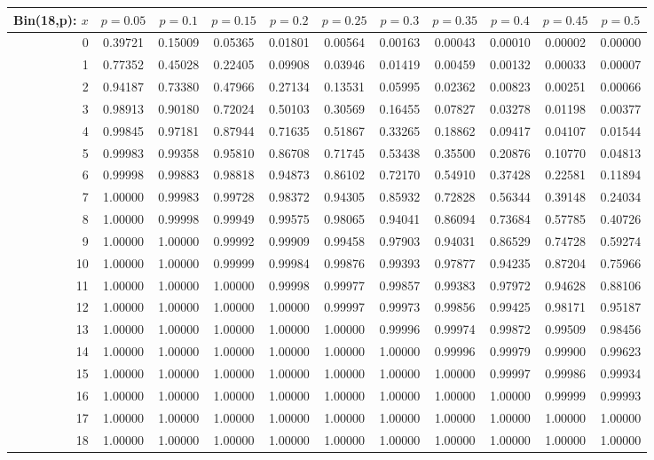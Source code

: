 \vspace{8pt minus 6pt}
\begin{tabular}{@{\extracolsep{-2pt}}|r|c|c|c|c|c|c|c|c|c|c|}
\hline
Bin(18,p): $x$
   & $p\!=\!0.05$& $p\!=\!0.1$& $p\!=\!0.15$& $p\!=\!0.2$& $p\!=\!0.25$& $p\!=\!0.3$& $p\!=\!0.35$& $p\!=\!0.4$& $p\!=\!0.45$& $p\!=\!0.5$\\\hline
  0&0.39721&0.15009&0.05365&0.01801&0.00564&0.00163&0.00043&0.00010&0.00002&0.00000\\
  1&0.77352&0.45028&0.22405&0.09908&0.03946&0.01419&0.00459&0.00132&0.00033&0.00007\\
  2&0.94187&0.73380&0.47966&0.27134&0.13531&0.05995&0.02362&0.00823&0.00251&0.00066\\
  3&0.98913&0.90180&0.72024&0.50103&0.30569&0.16455&0.07827&0.03278&0.01198&0.00377\\
  4&0.99845&0.97181&0.87944&0.71635&0.51867&0.33265&0.18862&0.09417&0.04107&0.01544\\
  5&0.99983&0.99358&0.95810&0.86708&0.71745&0.53438&0.35500&0.20876&0.10770&0.04813\\
  6&0.99998&0.99883&0.98818&0.94873&0.86102&0.72170&0.54910&0.37428&0.22581&0.11894\\
  7&1.00000&0.99983&0.99728&0.98372&0.94305&0.85932&0.72828&0.56344&0.39148&0.24034\\
  8&1.00000&0.99998&0.99949&0.99575&0.98065&0.94041&0.86094&0.73684&0.57785&0.40726\\
  9&1.00000&1.00000&0.99992&0.99909&0.99458&0.97903&0.94031&0.86529&0.74728&0.59274\\
 10&1.00000&1.00000&0.99999&0.99984&0.99876&0.99393&0.97877&0.94235&0.87204&0.75966\\
 11&1.00000&1.00000&1.00000&0.99998&0.99977&0.99857&0.99383&0.97972&0.94628&0.88106\\
 12&1.00000&1.00000&1.00000&1.00000&0.99997&0.99973&0.99856&0.99425&0.98171&0.95187\\
 13&1.00000&1.00000&1.00000&1.00000&1.00000&0.99996&0.99974&0.99872&0.99509&0.98456\\
 14&1.00000&1.00000&1.00000&1.00000&1.00000&1.00000&0.99996&0.99979&0.99900&0.99623\\
 15&1.00000&1.00000&1.00000&1.00000&1.00000&1.00000&1.00000&0.99997&0.99986&0.99934\\
 16&1.00000&1.00000&1.00000&1.00000&1.00000&1.00000&1.00000&1.00000&0.99999&0.99993\\
 17&1.00000&1.00000&1.00000&1.00000&1.00000&1.00000&1.00000&1.00000&1.00000&1.00000\\
 18&1.00000&1.00000&1.00000&1.00000&1.00000&1.00000&1.00000&1.00000&1.00000&1.00000\\
\hline
\end{tabular}

